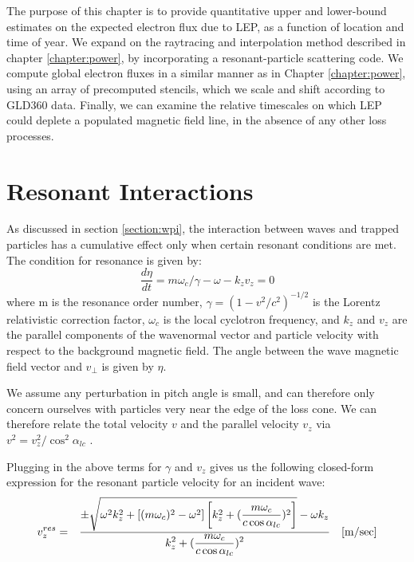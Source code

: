 The purpose of this chapter is to provide quantitative upper and lower-bound estimates on the expected electron flux due to LEP, as a function of location and time of year. We expand on the raytracing and interpolation method described in chapter \ref{chapter:power}, by incorporating a resonant-particle scattering code. We compute global electron fluxes in a similar manner as in Chapter \ref{chapter:power}, using an array of precomputed stencils, which we scale and shift according to GLD360 data. Finally, we can examine the relative timescales on which LEP could deplete a populated magnetic field line, in the absence of any other loss processes.

\section{Resonant Interactions}
As discussed in section \ref{section:wpi}, the interaction between waves and trapped particles has a cumulative effect only when certain resonant conditions are met. The condition for resonance is given by:
\begin{equation}
\frac{d\eta}{dt} = m \omega_c/\gamma - \omega - k_z v_z = 0
\label{eqn:resonance_cond}
\end{equation} 
where m is the resonance order number, $\gamma = (1 - v^2/c^2)^{-1/2}$ is the Lorentz relativistic correction factor, $\omega_c$ is the local cyclotron frequency, and $k_z$ and $v_z$ are the parallel components of the wavenormal vector and particle velocity with respect to the background magnetic field. The angle between the wave magnetic field vector and $v_\perp$ is given by $\eta$.

We assume any perturbation in pitch angle is small, and can therefore only concern ourselves with particles very near the edge of the loss cone. We can therefore relate the total velocity $v$ and the parallel velocity $v_z$ via $v^2 = v_z^2/\cos^2\alpha_{lc}$ \citep{Lauben2001, Bortnik2006}.

Plugging in the above terms for $\gamma$ and $v_z$ gives us the following closed-form expression for the resonant particle velocity for an incident wave:
\begin{eqnarray}
v_z^{res} & = & \frac{\displaystyle \pm \sqrt{\omega^2 k_z^2 + \left[ (m \omega_c)^2 - \omega^2 \right] \left[k_z^2 + (\frac{m \omega_c}{c \cos \alpha_{lc}})^2\right]} - \omega k_z}{\displaystyle k_z^2 + (\frac{m \omega_c}{c \cos \alpha_{lc}})^2} \quad[\mathrm{m/sec}]
\label{eqn:vzres}
\end{eqnarray}

